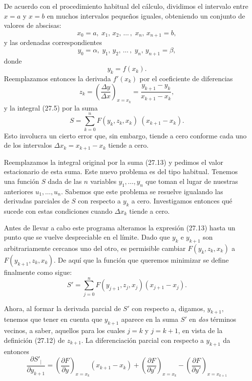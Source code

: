 \documentclass[12pt,a4paper]{book}
\begin{document}
De acuerdo con el procedimiento habitual del cálculo, dividimos el intervalo entre $x = a$ y $x = b$ en muchos intervalos pequeños iguales, obteniendo un conjunto de valores de abscisas:
\begin{equation}
x_0 = a, \; x_1, \, x_2, \, \ldots \, , \; x_n, \, x_{n+1} = b, \tag{27.9}
\end{equation}
y las ordenadas correspondientes
\begin{equation}
y_0 = \alpha, \; y_1, \, y_2, \, \ldots \, , \; y_n, \, y_{n+1} = \beta, \tag{27.10}
\end{equation}
donde
\begin{equation}
y_k = f(x_k). \tag{27.11}
\end{equation}
Reemplazamos entonces la derivada $f'(x_k)$ por el coeficiente de diferencias
\begin{equation}
z_k = \left( \frac{\Delta y}{\Delta x} \right)_{x = x_k} = \frac{y_{k+1} - y_k}{x_{k+1} - x_k}, \tag{27.12}
\end{equation}
y la integral (27.5) por la suma
\begin{equation}
S = \sum_{k=0}^{n} F(y_k, z_k, x_k) \; (x_{k+1} - x_k). \tag{27.13}
\end{equation}
Esto involucra un cierto error que, sin embargo, tiende a cero conforme cada uno de los intervalos $\Delta x_k = x_{k+1} - x_k$ tiende a cero.

Reemplazamos la integral original por la suma (27.13) y pedimos el valor estacionario de esta suma. Este nuevo problema es del tipo habitual. Tenemos una función $S$ dada de las $n$ variables $y_1, \ldots, y_n$ que toman el lugar de nuestras anteriores $u_1, \ldots, u_n$. Sabemos que este problema se resuelve igualando las derivadas parciales de $S$ con respecto a $y_k$ a cero. Investigamos entonces qué sucede con estas condiciones cuando $\Delta x_k$ tiende a cero.

Antes de llevar a cabo este programa alteramos la expresión (27.13) hasta un punto que se vuelve despreciable en el límite. Dado que $y_k$ e $y_{k+1}$ son arbitrariamente cercanos uno del otro, es permisible cambiar $F(y_k, z_k, x_k)$ a $F(y_{k+1}, z_k, x_k)$. De aquí que la función que queremos minimizar se define finalmente como sigue:
\begin{equation}
S' = \sum_{j=0}^{n} F(y_{j+1}, z_j, x_j)(x_{j+1} - x_j). \tag{27.14}
\end{equation}

Ahora, al formar la derivada parcial de $S'$ con respecto a, digamos, $y_{k+1}$, tenemos que tener en cuenta que $y_{k+1}$ aparece en la suma $S'$ en \textit{dos} términos vecinos, a saber, aquellos para los cuales $j = k$ y $j = k + 1$, en vista de la definición (27.12) de $z_{k+1}$. La diferenciación parcial con respecto a $y_{k+1}$ da entonces
\begin{equation}
\frac{\partial S'_|}{\partial y_{k+1}} = \left( \frac{\partial F}{\partial y} \right)_{x = x_k} (x_{k+1} - x_k) + \left( \frac{\partial F}{\partial y'} \right)_{x = x_k} - \left( \frac{\partial F}{\partial y'} \right)_{x = x_{k+1}} \tag{27.15}
\end{equation}
\end{document}
